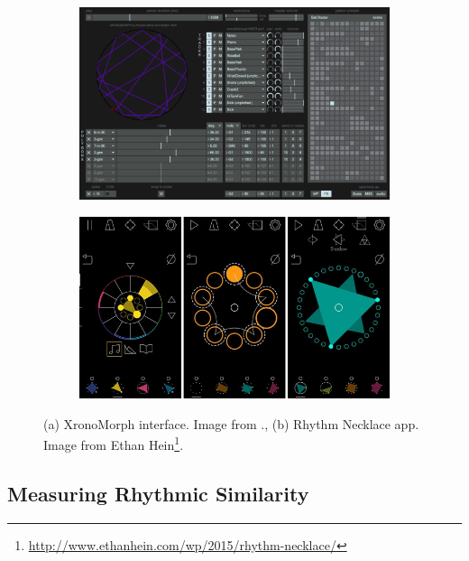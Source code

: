\begin{figure}
\centering
\begin{subfigure}[b]{1.0\textwidth}
   \includegraphics[width=1\linewidth]{ch03_symbolic/figures/xronomorph.png}
   \caption{}
   \label{fig:Ng1} 
\end{subfigure}

\begin{subfigure}[b]{1.0\textwidth}
   \includegraphics[width=1\linewidth]{ch03_symbolic/figures/necklace2.jpg}
   \caption{}
   \label{fig:Ng2}
\end{subfigure}

\caption[Necklace representation in Xronomorph and Necklace interfaces]{(a) XronoMorph interface. Image from \cite{Milne2016}., (b) Rhythm Necklace app. Image from Ethan Hein\footnote{\url{http://www.ethanhein.com/wp/2015/rhythm-necklace/}}.}
\end{figure}

\subsection{Measuring Rhythmic Similarity}


